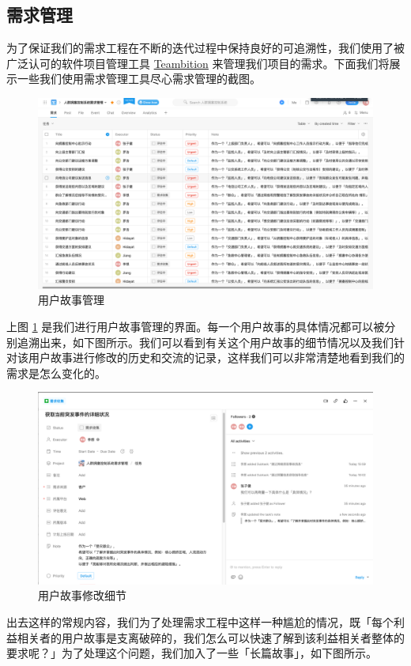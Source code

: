 \documentclass{ctexrep}
\begin{document}
\subsection{需求管理}
为了保证我们的需求工程在不断的迭代过程中保持良好的可追溯性，我们使用了被广泛认可的软件项目管理工具     \href{https://www.teambition.com/}{Teambition} 来管理我们项目的需求。下面我们将展示一些我们使用需求管理工具尽心需求管理的截图。
\begin{figure}[H]
	\centering
	\includegraphics[scale=0.24]{img/userStory.png}
	\caption{\label{fig:team_story} 用户故事管理}
\end{figure}
上图 \ref{fig:team_story} 是我们进行用户故事管理的界面。每一个用户故事的具体情况都可以被分别追溯出来，如下图所示。我们可以看到有关这个用户故事的细节情况以及我们针对该用户故事进行修改的历史和交流的记录，这样我们可以非常清楚地看到我们的需求是怎么变化的。
\begin{figure}[H]
	\centering
	\includegraphics[scale=0.24]{img/storyDetail.png}
	\caption{\label{fig:story_detail} 用户故事修改细节}
\end{figure}
出去这样的常规内容，我们为了处理需求工程中这样一种尴尬的情况，既「每个利益相关者的用户故事是支离破碎的，我们怎么可以快速了解到该利益相关者整体的要求呢？」为了处理这个问题，我们加入了一些「长篇故事」，如下图所示。
\end{document}
